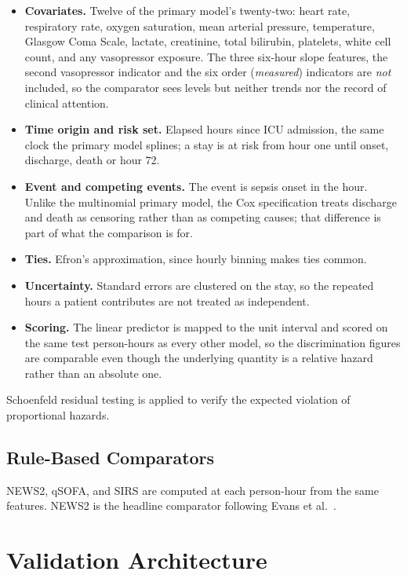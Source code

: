 \begin{itemize}
    \item \textbf{Covariates.} Twelve of the primary model's twenty-two: heart
    rate, respiratory rate, oxygen saturation, mean arterial pressure,
    temperature, Glasgow Coma Scale, lactate, creatinine, total bilirubin,
    platelets, white cell count, and any vasopressor exposure. The three
    six-hour slope features, the second vasopressor indicator and the six
    order (\emph{measured}) indicators are \emph{not} included, so the
    comparator sees levels but neither trends nor the record of clinical
    attention.
    \item \textbf{Time origin and risk set.} Elapsed hours since ICU admission,
    the same clock the primary model splines; a stay is at risk from hour one
    until onset, discharge, death or hour 72.
    \item \textbf{Event and competing events.} The event is sepsis onset in the
    hour. Unlike the multinomial primary model, the Cox specification treats
    discharge and death as censoring rather than as competing causes; that
    difference is part of what the comparison is for.
    \item \textbf{Ties.} Efron's approximation, since hourly binning makes ties
    common.
    \item \textbf{Uncertainty.} Standard errors are clustered on the stay, so
    the repeated hours a patient contributes are not treated as independent.
    \item \textbf{Scoring.} The linear predictor is mapped to the unit interval
    and scored on the same test person-hours as every other model, so the
    discrimination figures are comparable even though the underlying quantity
    is a relative hazard rather than an absolute one.
\end{itemize}

Schoenfeld residual testing is applied to verify the expected violation of
proportional hazards.

\subsection{Rule-Based Comparators}

NEWS2, qSOFA, and SIRS are computed at each person-hour from the same features.
NEWS2 is the headline comparator following Evans et al.\
\cite{evans2021ssc}.


\section{Validation Architecture}
\label{sec:validation}

